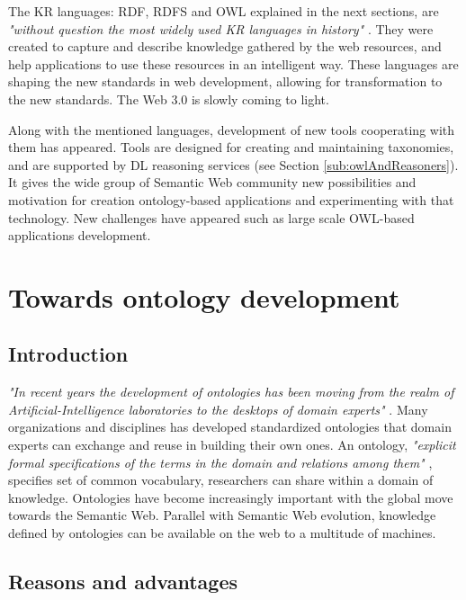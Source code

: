 The KR languages: RDF, RDFS and OWL explained in the next sections, are \textit{"without question the most widely used KR languages in history"} \cite{HLP08}. They were created to capture and describe knowledge gathered by the web resources, and help applications to use these resources in an intelligent way. These languages are shaping the new standards in web development, allowing for transformation to the new standards. The Web 3.0 is slowly coming to light.

Along with the mentioned languages, development of new tools cooperating with them has appeared. Tools are designed for creating and maintaining taxonomies, and are supported by DL reasoning services (see Section \ref{sub:owlAndReasoners}). It gives the wide group of Semantic Web community new possibilities and motivation for creation ontology-based applications and experimenting with that technology. New challenges have appeared such as large scale OWL-based applications development.

\newpage

\section{Towards ontology development}
\label{sec:towardsOntologyDevelopment}

\subsection{Introduction}
\label{sub:towardsOntologiesDevelopmentIntroduction}

\textit{"In recent years the development of ontologies has been moving from the realm of Artificial-Intelligence laboratories to the desktops of domain experts"} \cite{OntDev101}. Many organizations and disciplines has developed standardized ontologies that domain experts can exchange and reuse in building their own ones. An ontology, \textit{"explicit formal specifications of the terms in the domain and relations among them"} \cite{Gru93}, specifies set of common vocabulary, researchers can share within a domain of knowledge. Ontologies have become increasingly important with the global move towards the Semantic Web. Parallel with Semantic Web evolution, knowledge defined by ontologies can be available on the web to a multitude of machines. 

\subsection{Reasons and advantages}
\label{sub:reasonsAndAdvantages}

